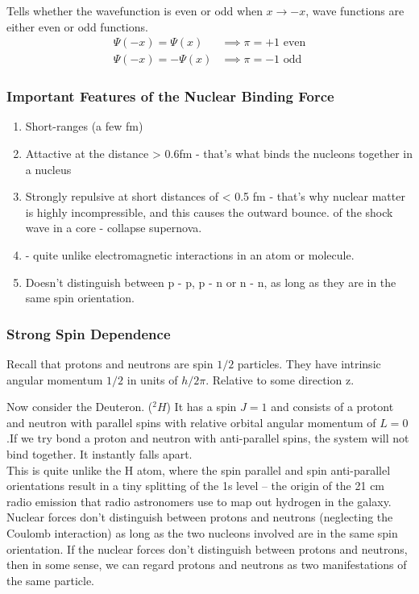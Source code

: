 \documentclass[english, 11pt]{article}
\begin{document}
      \begin{defn}[Parity]
        Tells whether the wavefunction is even or odd when $x \rightarrow -x$, wave functions are either even or odd functions. 
        \begin{align*}
          \Psi(-x) = \Psi(x) &\implies \pi = +1 \text{ even}\\
          \Psi(-x) = -\Psi(x) &\implies \pi = -1 \text{ odd}
        \end{align*}
      \end{defn}

      \subsubsection{Important Features of the Nuclear Binding Force}

      \begin{enumerate}
        \item Short-ranges (a few fm)
        \item Attactive at the distance > 0.6fm - that's what binds the nucleons together in a nucleus
        \item Strongly repulsive at short distances of < 0.5 fm - that's why nuclear matter is highly incompressible, and this causes the outward bounce. of the shock wave in a core - collapse supernova.
        \item {} - quite unlike electromagnetic interactions in an atom or molecule.
        \item Doesn't distinguish between p - p, p - n or n - n, as long as they are in the same spin orientation.
      \end{enumerate}

      \subsubsection{Strong Spin Dependence}\label{ssd}

      Recall that protons and neutrons are spin $1/2$ particles. They have intrinsic angular momentum $1/2$ in units of $h / 2 \pi$. Relative to some direction z.

      Now consider the Deuteron. ($^2H$) It has a spin $J=1$ and consists of a protont and neutron with parallel spins with relative orbital angular momentum of $L=0$.If we try bond a proton and neutron with anti-parallel spins, the system will not bind together. It instantly falls apart.\\
      This is quite unlike the H atom, where the spin parallel and spin anti-parallel orientations result in a tiny splitting of the 1s level -- the origin of the 21 cm radio emission that radio astronomers use to map out hydrogen in the galaxy.\\
      Nuclear forces don't distinguish between protons and neutrons (neglecting the Coulomb interaction) as long as the two nucleons involved are in the same spin orientation. If the nuclear forces don't distinguish between protons and neutrons, then in some sense, we can regard protons and neutrons as two manifestations of the same particle.
\end{document}
